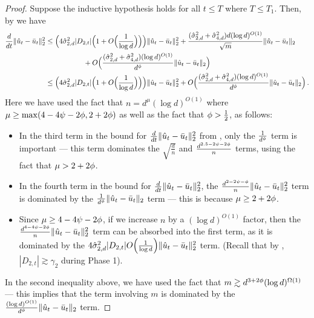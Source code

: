 \begin{proof}
Suppose the inductive hypothesis holds for all $t \leq T$ where $T \leq T_1$. Then, by  we have
\begin{align}
\frac{d}{dt} \|\hat{u}_t - \bar{u}_t\|_2^2
& \leq \Big(4 \hat{\sigma}_{2, d}^2 |D_{2, t}| \Big(1 + O\Big(\frac{1}{\log d}\Big)\Big) \Big) \|\hat{u}_t - \bar{u}_t\|_2^2 + \frac{(\hat{\sigma}_{2, d}^2 + \hat{\sigma}_{4, d}^2) d (\log d)^{O(1)}}{\sqrt{m}} \|\hat{u}_t - \bar{u}_t\|_2 \\
& \,\,\,\,\,\,\,\,\,\,\,\,\,\,\,\,\,\,\,\,\,\,\,\,\,\,\,\,\,\,\,\, + O\Big(\frac{(\hat{\sigma}_{2, d}^2 + \hat{\sigma}_{4, d}^2) (\log d)^{O(1)}}{d^\phi} \|\hat{u}_t - \bar{u}_t\|_2\Big) \\
& \leq \Big(4 \hat{\sigma}_{2, d}^2 |D_{2, t}| \Big(1 + O\Big(\frac{1}{\log d}\Big)\Big) \Big) \|\hat{u}_t - \bar{u}_t\|_2^2 + O\Big(\frac{(\hat{\sigma}_{2, d}^2 + \hat{\sigma}_{4, d}^2) (\log d)^{O(1)}}{d^\phi} \|\hat{u}_t - \bar{u}_t\|_2\Big) \,.
\end{align}
Here we have used the fact that $n = d^\mu (\log d)^{O(1)}$ where $\mu \geq \max(4 - 4 \psi - 2 \phi, 2 + 2 \phi)$ as well as the fact that $\phi > \frac{1}{2}$, as follows:
\begin{itemize}
    \item In the third term in the bound for $\frac{d}{dt} \|\hat{u}_t - \bar{u}_t\|_2^2$ from , only the $\frac{1}{d^\phi}$ term is important --- this term dominates the $\sqrt{\frac{d}{n}}$ and $\frac{d^{2.5 - 2\psi - 2\phi}}{n}$ terms, using the fact that $\mu > 2 + 2\phi$.
    \item In the fourth term in the bound for $\frac{d}{dt} \|\hat{u}_t - \bar{u}_t\|_2^2$, the $\frac{d^{2 - 2\psi - \phi}}{n} \|\hat{u}_t - \bar{u}_t\|_2^2$ term is dominated by the $\frac{1}{d^\phi} \|\hat{u}_t - \bar{u}_t\|_2$ term --- this is because $\mu \geq 2 + 2 \phi$.
    \item Since $\mu \geq 4 - 4\psi - 2\phi$, if we increase $n$ by a $(\log d)^{O(1)}$ factor, then the $\frac{d^{4 - 4\psi - 2\phi}}{n} \|\hat{u}_t - \bar{u}_t\|_2^2$ term can be absorbed into the first term, as it is dominated by the $4 \hat{\sigma}_{2, d}^2 |D_{2, t}| O\Big(\frac{1}{\log d}\Big) \|\hat{u}_t - \bar{u}_t\|_2^2$ term. (Recall that by , $|D_{2, t}| \gtrsim \gamma_2$ during Phase 1).
\end{itemize}
In the second inequality above, we have used the fact that $m \gtrsim d^{3 + 2 \phi} (\log d)^{\Omega(1)}$ --- this implies that the term involving $m$ is dominated by the $\frac{(\log d)^{O(1)}}{d^\phi} \|\hat{u}_t - \bar{u}_t\|_2$ term.


\end{proof}

